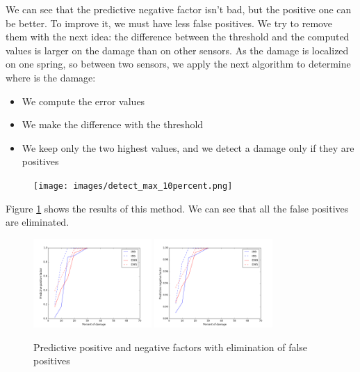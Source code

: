 \documentclass[journal]{IEEEtran}
\begin{document}

We can see that the predictive negative factor isn't bad, but the positive one can be better. To improve it, we must have less false positives. We try to remove them with the next idea: the difference between the threshold and the computed values is larger on the damage than on other sensors. As the damage is localized on one spring, so between two sensors, we apply the next algorithm to determine where is the damage:
\begin{itemize}
\item We compute the error values
\item We make the difference with the threshold
\item We keep only the two highest values, and we detect a damage only if they are positives
\end{itemize}

\begin{figure}[h!]
  \centering
  \texttt{[image: images/detect\_max\_10percent.png]}
  \caption{}
  \label{detect_max}
\end{figure}

Figure \ref{detect_max} shows the results of this method. We can see that all the false positives are eliminated.


\begin{figure}[h!]
  \centering
  \includegraphics[width=0.4\textwidth]{images/pred_max.png}
  \includegraphics[width=0.4\textwidth]{images/pred_neg_max.png}
  \caption{Predictive positive and negative factors with elimination of false positives}
  \label{pred_max}
\end{figure}
\end{document}
